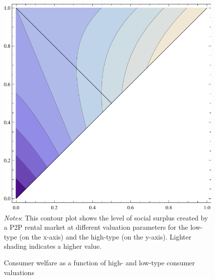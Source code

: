 \documentclass[11pt]{article}
\begin{document}
\begin{figure}
\centering 
\caption{Consumer welfare as a function of high- and low-type consumer valuations}
\label{fig:welfare}
\begin{minipage}{0.50 \linewidth}
\includegraphics[width = \linewidth]{./plots/welfare.pdf} \\
\emph{Notes}: This contour plot shows the level of social surplus created by a P2P rental market at different valuation parameters for the low-type (on the x-axis) and the high-type (on the y-axis).
Lighter shading indicates a higher value. 
\end{minipage} 
\end{figure} 
\end{document}
